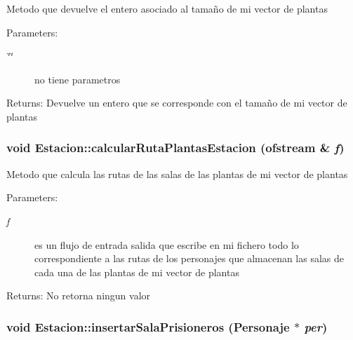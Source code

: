 Metodo que devuelve el entero asociado al tamaño de mi vector de plantas \begin{Desc}
\item[Parameters:]
\begin{description}
\item[{\em \char`\"{}\char`\"{}}]no tiene parametros \end{description}
\end{Desc}
\begin{Desc}
\item[Returns:]Devuelve un entero que se corresponde con el tamaño de mi vector de plantas \end{Desc}
\hypertarget{classEstacion_b823f96e5395cf3b55ddfe2a380066a7}{
\subsubsection[calcularRutaPlantasEstacion]{\setlength{\rightskip}{0pt plus 5cm}void Estacion::calcularRutaPlantasEstacion (ofstream \& {\em f})}}
\label{classEstacion_b823f96e5395cf3b55ddfe2a380066a7}


Metodo que calcula las rutas de las salas de las plantas de mi vector de plantas \begin{Desc}
\item[Parameters:]
\begin{description}
\item[{\em f}]es un flujo de entrada salida que escribe en mi fichero todo lo correspondiente a las rutas de los personajes que almacenan las salas de cada una de las plantas de mi vector de plantas \end{description}
\end{Desc}
\begin{Desc}
\item[Returns:]No retorna ningun valor \end{Desc}
\hypertarget{classEstacion_5e2d125234916b8011eabaf9735fd859}{
\subsubsection[insertarSalaPrisioneros]{\setlength{\rightskip}{0pt plus 5cm}void Estacion::insertarSalaPrisioneros ({\bf Personaje} $\ast$ {\em per})}}
\label{classEstacion_5e2d125234916b8011eabaf9735fd859}


